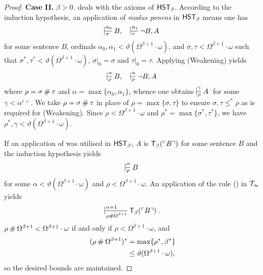 \documentclass[UKenglish,cleveref,DIV=12]{scrartcl}
\theoremstyle{definition}
\theoremstyle{definition}
\begin{document}
\begin{proof}
\noindent\textbf{Case II.} \textit{${\beta>0}$.}
 deals with the axioms of $\mathsf{HST}_\beta$. According to the
induction hypothesis, an application of \emph{modus ponens} in $\mathsf{HST}_\beta$ means one has
\begin{align*}%
 \prov{\alpha_0}{\sigma}{B,}&&   \prov{\alpha_1}{\tau}{\lnot B,A}
\end{align*}
for some sentence $B$, ordinals
$\alpha_0,\alpha_1<\vartheta(\Omega^{\beta+1}\cdot\omega)$, and
$\sigma,\tau<\Omega^{\beta+1}\cdot\omega$ such that
$\sigma^*,\tau^*<\vartheta(\Omega^{\beta+1}\cdot\omega)$, $\sigma|_0=\sigma$ and $\tau|_0=\tau$. Applying (Weakening)
yields
\begin{align*}%
 \prov{\alpha}{\rho}{B,}& &\prov{\alpha}{\rho}{\lnot B,A}
\end{align*}
where $\rho=\sigma\mathbin{\#}\tau$ and $\alpha=\max\{\alpha_0,\alpha_1\}$, whence one obtains
$\prov\gamma\rho A$ for some $\gamma<\alpha^{\varepsilon+}$. We
take $\rho=\sigma\mathbin{\#}\tau$ in place of $\rho=\max\{\sigma,\tau\}$ to ensure
$\sigma,\tau\le^* \rho$ as is required for (Weakening). Since
$\rho<\Omega^{\beta+1}\cdot\omega$ and  $\rho^*=\max\{\sigma^*,\tau^*\}$, we have
$\rho^*,\gamma<\vartheta(\Omega^{\beta+1}\cdot\omega)$.

If an application of \Nec\beta was utilised in $\mathsf{HST}_\beta$, $A$ is $\mathsf{T}_\beta(\ulcorner{B}\urcorner)$ for some sentence $B$ and the induction hypothesis yields
\begin{align*}
 \prov\alpha\rho B
\end{align*}
for some $\alpha<\vartheta(\Omega^{\beta+1}\cdot\omega)$ and
$\rho<\Omega^{\beta+1}\cdot\omega$. An application of the rule (\Nec\beta)
in $\mathcal{T}_\infty$ yields
\begin{align*}
  \prov{\alpha+1}{\rho\nsum\Omega^{\beta+1}} {\T_\beta(\gn B)}.
\end{align*}
$\rho\mathbin{\#}\Omega^{\beta+1}<\Omega^{\beta+1}\cdot\omega$ if and only if
$\rho<\Omega^{\beta+1}\cdot\omega$, and
\begin{align*}
  (\rho\mathbin{\#}\Omega^{\beta+1})^*&=\max\{\rho^*,\beta^*\}\\
	&\le\vartheta(\Omega^{\beta+1}\cdot\omega),
\end{align*}
so the desired bounds are maintained.


\end{proof}
\end{document}
